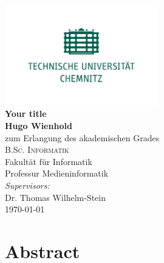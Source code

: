 \documentclass[
  11pt,
  a4paper,
  oneside
]{book}
\begin{document}
\frontmatter

\begin{titlepage}
\begin{center}
 \includegraphics[width=0.5\textwidth]{tuc}\\ %
 {\huge\bfseries Your title\\[5pt] } %
 \vspace{1.5cm}
 {\Large\bfseries Hugo Wienhold}\\[5pt] %
 \vspace{2cm}
{zum Erlangung des akademischen Grades} \\[2cm]
\textsc{\Large{{B.Sc. Informatik}}} \\[5pt] %
 \vfill
{Fakultät für Informatik}\\[5pt] %
{Professur Medieninformatik}\\[5pt] %
 \vfill
\emph{Supervisors:}\\ %
Dr. Thomas Wilhelm-Stein \\
 \vfill
{\today} %
\end{center}
\end{titlepage}

\chapter*{Abstract}
\label{sec:abstract}


{
\setcounter{tocdepth}{3}
\hypersetup{linkcolor=black}
\tableofcontents
}
\end{document}
